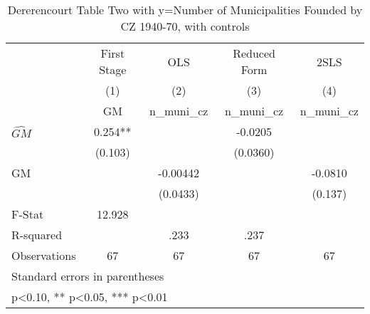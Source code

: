\begin{table}[htbp]\centering
\def\sym#1{\ifmmode^{#1}\else\(^{#1}\)\fi}
\caption{Dererencourt Table Two with y=Number of Municipalities Founded by CZ 1940-70, with controls}
\begin{tabular}{l*{4}{c}}
\toprule
                    & First Stage   &         OLS   &Reduced Form   &        2SLS   \\
                    &\multicolumn{1}{c}{(1)}&\multicolumn{1}{c}{(2)}&\multicolumn{1}{c}{(3)}&\multicolumn{1}{c}{(4)}\\
                    &\multicolumn{1}{c}{GM}&\multicolumn{1}{c}{n\_muni\_cz}&\multicolumn{1}{c}{n\_muni\_cz}&\multicolumn{1}{c}{n\_muni\_cz}\\
\midrule
$\hat{GM}$          &       0.254** &               &     -0.0205   &               \\
                    &     (0.103)   &               &    (0.0360)   &               \\
\addlinespace
GM                  &               &    -0.00442   &               &     -0.0810   \\
                    &               &    (0.0433)   &               &     (0.137)   \\
\midrule
F-Stat              &      12.928   &               &               &               \\
R-squared           &               &        .233   &        .237   &               \\
Observations        &          67   &          67   &          67   &          67   \\
\bottomrule
\multicolumn{5}{l}{\footnotesize Standard errors in parentheses}\\
\multicolumn{5}{l}{\footnotesize * p<0.10, ** p<0.05, *** p<0.01}\\
\end{tabular}
\end{table}
